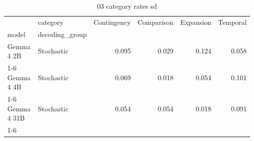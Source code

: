 \begin{table}
\caption{03 category rates sd}
\begin{tabular}{llrrrr}
\toprule
 & category & Contingency & Comparison & Expansion & Temporal \\
model & decoding_group &  &  &  &  \\
\midrule
Gemma 4 2B & Stochastic & 0.095 & 0.029 & 0.124 & 0.058 \\
\cline{1-6}
Gemma 4 4B & Stochastic & 0.069 & 0.018 & 0.054 & 0.101 \\
\cline{1-6}
Gemma 4 31B & Stochastic & 0.054 & 0.054 & 0.018 & 0.091 \\
\cline{1-6}
\bottomrule
\end{tabular}
\end{table}
